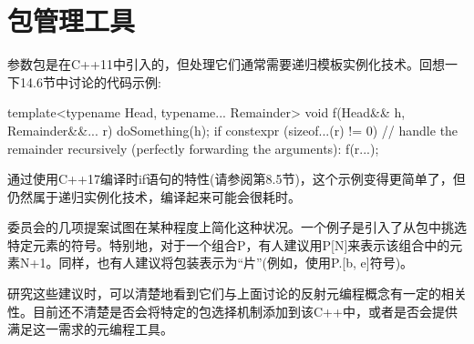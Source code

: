 \section{包管理工具}
参数包是在C++11中引入的，但处理它们通常需要递归模板实例化技术。回想一下14.6节中讨论的代码示例:

\begin{cpp}
template<typename Head, typename... Remainder>
void f(Head&& h, Remainder&&... r) {
	doSomething(h);
	if constexpr (sizeof...(r) != 0) {
		// handle the remainder recursively (perfectly forwarding the arguments):
		f(r...);
	}
}
\end{cpp}

通过使用C++17编译时if语句的特性(请参阅第8.5节)，这个示例变得更简单了，但仍然属于递归实例化技术，编译起来可能会很耗时。

委员会的几项提案试图在某种程度上简化这种状况。一个例子是引入了从包中挑选特定元素的符号。特别地，对于一个组合P，有人建议用P[N]来表示该组合中的元素N+1。同样，也有人建议将包装表示为“片”(例如，使用P.[b, e]符号)。

研究这些建议时，可以清楚地看到它们与上面讨论的反射元编程概念有一定的相关性。目前还不清楚是否会将特定的包选择机制添加到该C++中，或者是否会提供满足这一需求的元编程工具。




















































